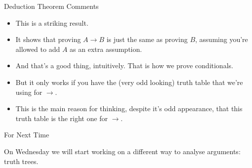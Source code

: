 \documentclass[
  ignorenonframetext,
]{beamer}
\providecommand{\tightlist}{%
  \setlength{\itemsep}{0pt}\setlength{\parskip}{0pt}}
\renewcommand{\,}{\text{, }}
\begin{document}
\begin{frame}{Deduction Theorem Comments}
\protect\hypertarget{deduction-theorem-comments}{}

\begin{itemize}
\tightlist
\item
  This is a striking result.
\item
  It shows that proving \(A \rightarrow B\) is just the same as proving
  \(B\), assuming you're allowed to add \(A\) as an extra assumption.
\item
  And that's a good thing, intuitively. That is how we prove
  conditionals.
\item
  But it only works if you have the (very odd looking) truth table that
  we're using for \(\rightarrow\).
\item
  This is the main reason for thinking, despite it's odd appearance,
  that this truth table is the right one for \(\rightarrow\).
\end{itemize}

\end{frame}

\begin{frame}{For Next Time}
\protect\hypertarget{for-next-time}{}

On Wednesday we will start working on a different way to analyse
arguments: truth trees.

\end{frame}
\end{document}
